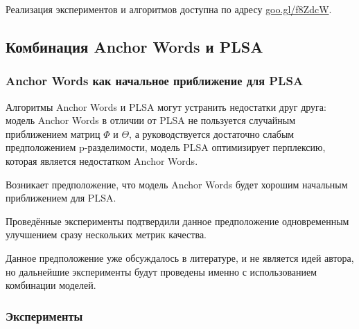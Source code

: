 \documentclass[a4paper, 14pt]{extarticle}
\begin{document}
Реализация экспериментов и алгоритмов доступна по адресу  \href{https://goo.gl/f8ZdcW}{goo.gl/f8ZdcW}. 

\subsection{Комбинация Anchor Words и PLSA}
\subsubsection*{Anchor Words как начальное приближение для PLSA}
	Алгоритмы Anchor Words и PLSA могут устранить недостатки друг друга: модель Anchor Words в отличии от PLSA не пользуется случайным приближением матриц $\Phi$ и $\Theta$, а руководствуется достаточно слабым предположением p-разделимости, модель PLSA оптимизирует перплексию, которая является недостатком Anchor Words.
	
	Возникает предположение, что модель Anchor Words будет хорошим  начальным приближением для PLSA. 
	
	Проведённые эксперименты подтвердили данное предположение одновременным улучшением сразу нескольких метрик качества. 
	
	Данное предположение уже обсуждалось в литературе, и не является идей автора, но дальнейшие эксперименты будут проведены именно с использованием комбинации моделей. 	
\subsubsection*{Эксперименты}
\end{document}
